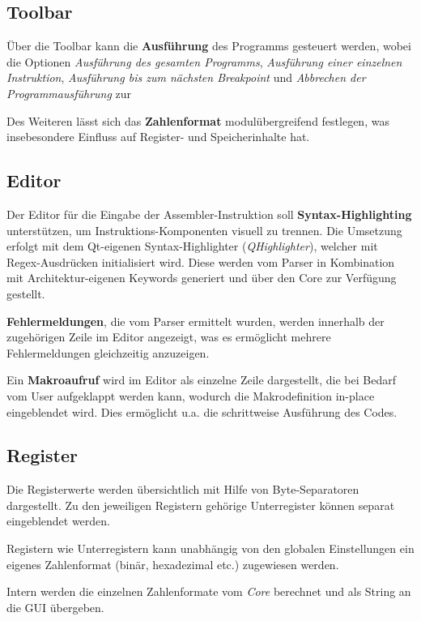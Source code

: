 \subsection{Toolbar}

Über die Toolbar kann die \textbf{Ausführung} des Programms gesteuert werden, wobei die Optionen \textit{Ausführung des gesamten Programms}, \textit{Ausführung einer einzelnen Instruktion}, \textit{Ausführung bis zum
  nächsten Breakpoint} und \textit{Abbrechen der Programmausführung} zur

Des Weiteren lässt sich das \textbf{Zahlenformat} modulübergreifend festlegen, was insebesondere Einfluss auf Register- und Speicherinhalte hat.

\subsection{Editor}

Der Editor für die Eingabe der Assembler-Instruktion soll \textbf{Syntax-Highlighting} unterstützen, um Instruktions-Komponenten visuell zu trennen. Die Umsetzung erfolgt mit dem Qt-eigenen Syntax-Highlighter (\textit{QHighlighter}), welcher mit Regex-Ausdrücken initialisiert wird. Diese werden vom Parser in Kombination mit Architektur-eigenen Keywords generiert und über den Core zur Verfügung gestellt.

\textbf{Fehlermeldungen}, die vom Parser ermittelt wurden, werden innerhalb der zugehörigen Zeile im Editor angezeigt, was es ermöglicht mehrere Fehlermeldungen gleichzeitig anzuzeigen.

Ein \textbf{Makroaufruf} wird im Editor als einzelne Zeile dargestellt, die bei Bedarf vom User aufgeklappt werden kann, wodurch die Makrodefinition in-place eingeblendet wird. Dies ermöglicht u.a. die schrittweise Ausführung des Codes.

\subsection{Register}

Die Registerwerte werden übersichtlich mit Hilfe von Byte-Separatoren dargestellt. Zu den jeweiligen Registern gehörige Unterregister können separat eingeblendet werden.

Registern wie Unterregistern kann unabhängig von den globalen Einstellungen ein eigenes Zahlenformat (binär, hexadezimal etc.) zugewiesen werden.

Intern werden die einzelnen Zahlenformate vom \textit{Core} berechnet und als String an die GUI übergeben.

